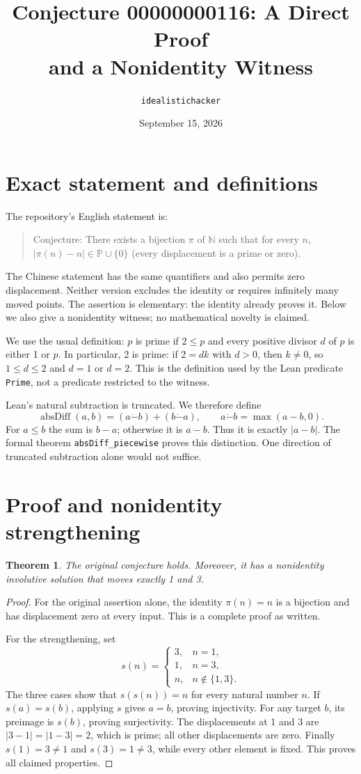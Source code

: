 \documentclass[10pt]{article}
\title{Conjecture 00000000116: A Direct Proof\\
\large and a Nonidentity Witness}
\author{\texttt{idealistichacker}}
\date{September 15, 2026}
\newtheorem{theorem}{Theorem}
\newcommand{\NN}{\mathbb{N}}
\begin{document}
\maketitle

\section{Exact statement and definitions}
The repository's English statement is:
\begin{quote}
Conjecture: There exists a bijection $\pi$ of $\NN$ such that for every $n$,
$|\pi(n)-n|\in\mathbb{P}\cup\{0\}$ (every displacement is a prime or zero).
\end{quote}
The Chinese statement has the same quantifiers and also permits zero
displacement. Neither version excludes the identity or requires infinitely
many moved points. The assertion is elementary: the identity already proves
it. Below we also give a nonidentity witness; no mathematical novelty is claimed.

We use the usual definition: $p$ is prime if $2\leq p$ and every positive
divisor $d$ of $p$ is either 1 or $p$. In particular, 2 is prime: if
$2=dk$ with $d>0$, then $k\ne0$, so $1\leq d\leq2$ and $d=1$ or $d=2$.
This is the definition used by the Lean predicate \texttt{Prime}, not a
predicate restricted to the witness.

Lean's natural subtraction is truncated. We therefore define
\[
  \operatorname{absDiff}(a,b)=(a\mathbin{\dot-}b)+(b\mathbin{\dot-}a),
  \qquad a\mathbin{\dot-}b=\max(a-b,0).
\]
For $a\leq b$ the sum is $b-a$; otherwise it is $a-b$. Thus it is exactly
$|a-b|$. The formal theorem \texttt{absDiff\_piecewise} proves this distinction.
One direction of truncated subtraction alone would not suffice.

\section{Proof and nonidentity strengthening}
\begin{theorem}
The original conjecture holds. Moreover, it has a nonidentity involutive
solution that moves exactly 1 and 3.
\end{theorem}
\begin{proof}
For the original assertion alone, the identity $\pi(n)=n$ is a bijection
and has displacement zero at every input. This is a complete proof as written.

For the strengthening, set
\[
 s(n)=\begin{cases}3,&n=1,\\1,&n=3,\\n,&n\notin\{1,3\}.\end{cases}
\]
The three cases show that $s(s(n))=n$ for every natural number $n$.
If $s(a)=s(b)$, applying $s$ gives $a=b$, proving injectivity.
For any target $b$, its preimage is $s(b)$, proving surjectivity.
The displacements at 1 and 3 are $|3-1|=|1-3|=2$, which is prime;
all other displacements are zero. Finally $s(1)=3\ne1$ and $s(3)=1\ne3$,
while every other element is fixed. This proves all claimed properties.
\end{proof}
\end{document}
